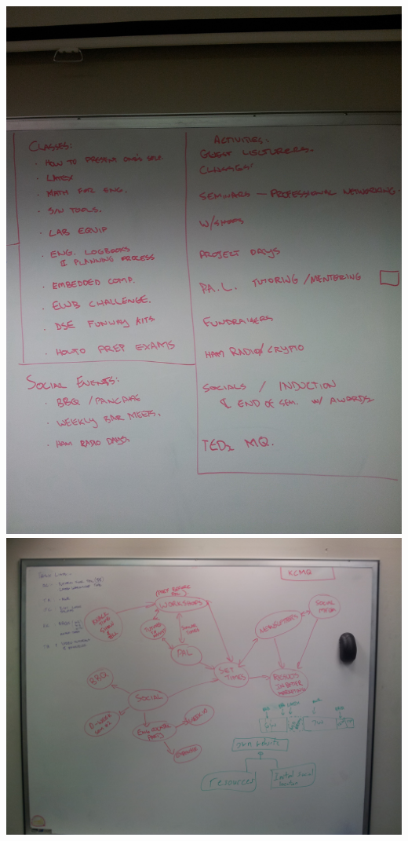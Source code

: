 \includegraphics[angle=270, width=\textwidth]{img/IMG_20120706_181226.jpg}
\newpage
\includegraphics[angle=90, width=\textwidth]{img/IMG_20120706_181239.jpg}
